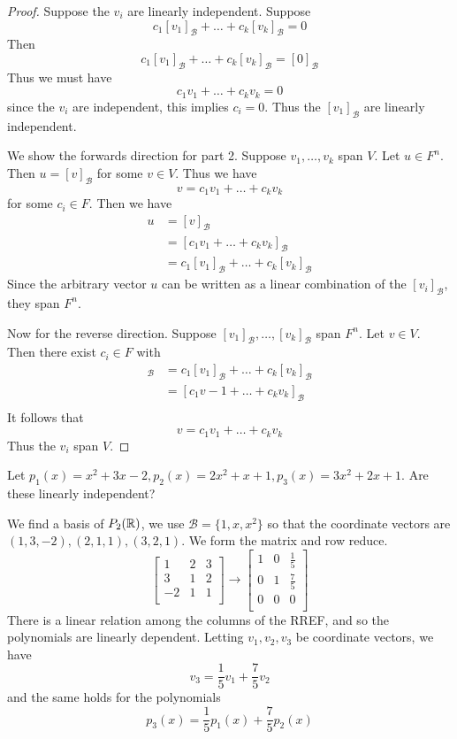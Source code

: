 \documentclass{article}
\begin{document}
\begin{proof}
  Suppose the $v_i$ are linearly independent. Suppose \[
    c_1[v_1]_\mathcal{B} + \dots + c_k[v_k]_\mathcal{B} = 0
  \]
  Then \[
    c_1[v_1]_\mathcal{B} + \dots + c_k[v_k]_\mathcal{B} = [0]_\mathcal{B}
  \]
  Thus we must have \[
    c_1v_1 + \dots + c_kv_k = 0
  \]
  since the $v_i$ are independent, this implies $c_i = 0$. Thus the $[v_1]_\mathcal{B}$ are linearly independent.

  We show the forwards direction for part 2.
  Suppose $v_1, \ldots, v_k$ span $V$. Let $u \in F^n$. Then $u = [v]_\mathcal{B}$ for some $v \in V$. Thus we have \[
    v = c_1v_1 + \dots + c_kv_k
  \]
  for some $c_i \in F$. Then we have
  \begin{align*}
    u &= [v]_\mathcal{B}\\
    &= [c_1v_1 + \dots + c_kv_k]_\mathcal{B}\\
    &= c_1[v_1]_\mathcal{B} + \dots + c_k[v_k]_\mathcal{B}
  \end{align*}
  Since the arbitrary vector $u$ can be written as a linear combination of the $[v_i]_\mathcal{B}$, they span $F^n$.

  Now for the reverse direction. Suppose $[v_1]_\mathcal{B}, \ldots, [v_k]_\mathcal{B}$ span $F^n$. Let $v \in V$. Then there exist $c_i \in F$ with
  \begin{align*}
    [v]_\mathcal{B} &= c_1[v_1]_\mathcal{B} + \dots + c_k[v_k]_\mathcal{B}\\
    &= [c_1v-1 + \dots + c_kv_k]_\mathcal{B}\\
  \end{align*}
  It follows that \[
    v = c_1v_1 + \dots + c_kv_k
  \]
  Thus the $v_i$ span $V$.
\end{proof}
\begin{example}
  Let $p_1(x) = x^2 + 3x - 2, p_2(x) = 2x^2 + x + 1, p_3(x) = 3x^2 + 2x + 1$. Are these linearly independent?

  We find a basis of $P_2(\mathbb{R})$, we use $\mathcal{B} = \{1, x, x^2\}$ so that the coordinate vectors are $(1, 3, -2), (2, 1, 1), (3, 2, 1)$. We form the matrix and row reduce.
  \[
    \begin{bmatrix}
      1 & 2 & 3\\
      3 & 1 & 2\\
      -2 & 1 & 1\\
    \end{bmatrix} \to
    \begin{bmatrix}
      1 & 0 & \frac{1}{5}\\
      0 & 1 & \frac{7}{5}\\
      0 & 0 & 0\\
    \end{bmatrix}
  \]
  There is a linear relation among the columns of the RREF, and so the polynomials are linearly dependent. Letting $v_1, v_2, v_3$ be coordinate vectors, we have
  \[
    v_3 = \frac{1}{5}v_1 + \frac{7}{5}v_2
  \]
  and the same holds for the polynomials
  \[
    p_3(x) = \frac{1}{5}p_1(x) + \frac{7}{5}p_2(x)
  \]
\end{example}
\end{document}

